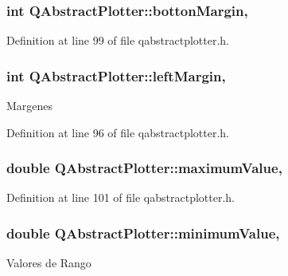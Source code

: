 \subsubsection[{botton\+Margin}]{\setlength{\rightskip}{0pt plus 5cm}int Q\+Abstract\+Plotter\+::botton\+Margin\hspace{0.3cm}{\ttfamily [read]}, {\ttfamily [write]}}\label{class_q_abstract_plotter_abdc7187a3e5c356f116fd768c93a8029}


Definition at line 99 of file qabstractplotter.\+h.

\hypertarget{class_q_abstract_plotter_abc58221e36fd9351998fb998a76de8dd}{}
\subsubsection[{left\+Margin}]{\setlength{\rightskip}{0pt plus 5cm}int Q\+Abstract\+Plotter\+::left\+Margin\hspace{0.3cm}{\ttfamily [read]}, {\ttfamily [write]}}\label{class_q_abstract_plotter_abc58221e36fd9351998fb998a76de8dd}
Margenes 

Definition at line 96 of file qabstractplotter.\+h.

\hypertarget{class_q_abstract_plotter_ada42f078142e1d9bd4edf734937eba7e}{}
\subsubsection[{maximum\+Value}]{\setlength{\rightskip}{0pt plus 5cm}double Q\+Abstract\+Plotter\+::maximum\+Value\hspace{0.3cm}{\ttfamily [read]}, {\ttfamily [write]}}\label{class_q_abstract_plotter_ada42f078142e1d9bd4edf734937eba7e}


Definition at line 101 of file qabstractplotter.\+h.

\hypertarget{class_q_abstract_plotter_a212efe72e136b731ca4156af54e179a1}{}
\subsubsection[{minimum\+Value}]{\setlength{\rightskip}{0pt plus 5cm}double Q\+Abstract\+Plotter\+::minimum\+Value\hspace{0.3cm}{\ttfamily [read]}, {\ttfamily [write]}}\label{class_q_abstract_plotter_a212efe72e136b731ca4156af54e179a1}
Valores de Rango 


